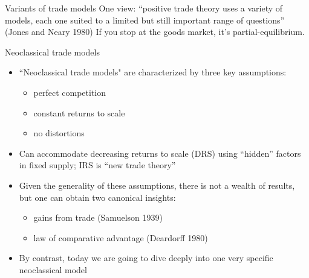 \documentclass[10pt,notes=hide,aspectratio=169]{beamer}
\begin{document}
\begin{frame}{Variants of trade models}
One view: ``positive trade theory uses a variety of models, each one suited to a limited but still important range of questions''
{\small (Jones and Neary 1980)}
\bigskip
{}
\bigskip
If you stop at the goods market, it's partial-equilibrium.
\end{frame}
\begin{frame}{Neoclassical trade models}
\begin{itemize}
\item ``Neoclassical trade models" are characterized by three key
assumptions:
\begin{itemize}
	\item perfect competition
	\item constant returns to scale
	\item no distortions
\end{itemize}
\item Can accommodate decreasing returns to scale (DRS) using ``hidden'' factors in fixed supply;
IRS is ``new trade theory''
\item Given the generality of these assumptions, there is not a wealth of results, but one can obtain two canonical insights: 
\begin{itemize}
	\item gains from trade (Samuelson 1939)
	\item law of comparative advantage (Deardorff 1980)
\end{itemize}
\item By contrast, today we are going to dive deeply into one very specific neoclassical model
\end{itemize}
\end{frame}
\end{document}
